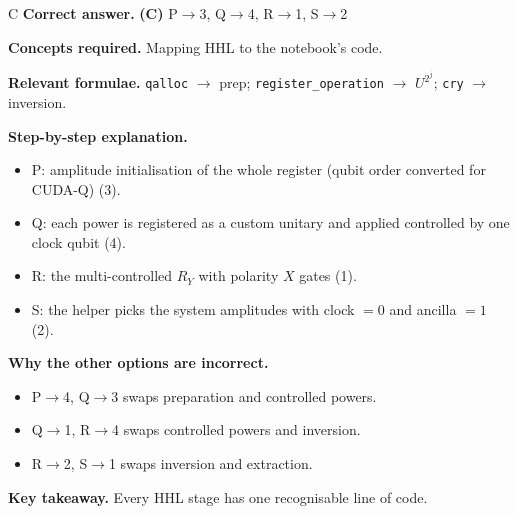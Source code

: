 \documentclass[11pt,a4paper]{article}
\newcommand{\qsep}{\par\vspace{2pt}{\color{black!15}\hrule}\vspace{4pt}}
\begin{document}
\begin{solbox}{C}
\textbf{\color{brand}Correct answer.} \textcolor{okgreen}{\textbf{(C)}} P$\to$3, Q$\to$4, R$\to$1, S$\to$2

\textbf{\color{brand}Concepts required.} Mapping HHL to the notebook's code.

\textbf{\color{brand}Relevant formulae.} \texttt{qalloc} $\to$ prep; \texttt{register\_operation} $\to$ $U^{2^j}$; \texttt{cry} $\to$ inversion.

\textbf{\color{brand}Step-by-step explanation.} \begin{itemize}\itemsep0pt
\item P: amplitude initialisation of the whole register (qubit order converted for CUDA-Q) (3).
\item Q: each power is registered as a custom unitary and applied controlled by one clock qubit (4).
\item R: the multi-controlled $R_Y$ with polarity $X$ gates (1).
\item S: the helper picks the system amplitudes with clock $= 0$ and ancilla $= 1$ (2).
\end{itemize}

\textbf{\color{brand}Why the other options are incorrect.}
\begin{itemize}[leftmargin=2.4em, itemsep=1pt, topsep=2pt]
\item[\textbf{(A)}] P$\to$4, Q$\to$3 swaps preparation and controlled powers.
\item[\textbf{(B)}] Q$\to$1, R$\to$4 swaps controlled powers and inversion.
\item[\textbf{(D)}] R$\to$2, S$\to$1 swaps inversion and extraction.
\end{itemize}
\textbf{\color{brand}Key takeaway.} Every HHL stage has one recognisable line of code.
\end{solbox}
\qsep
\end{document}

